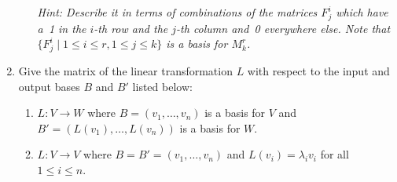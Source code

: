 \begin{enumerate}
\begin{enumerate}
\emph{Hint: Describe it in terms of combinations of the matrices $F^i_j$ which have a~1 in the $i$-th row and the $j$-th column and~0 everywhere else. Note that $\{F^i_j \mid 1 \leq i \leq r, 1 \leq j \leq k\}$ is a basis for $M^r_k$.}
\end{enumerate}

\item Give the matrix of the linear transformation $L$ with respect to the input and output bases $B$ and $B'$ listed below:
\begin{enumerate}
\item $L:V\rightarrow W$ where $B=(v_1,\ldots, v_n)$ is a basis for $V$ and $B'=(L(v_1),\ldots, L(v_n))$ is a basis for $W$.
\item $L:V\rightarrow V$ where $B=B'=(v_1,\ldots,v_n)$ and $L(v_i)=\lambda_i v_i$ for all~$1\leq i\leq n$.
\end{enumerate}


\end{enumerate}

